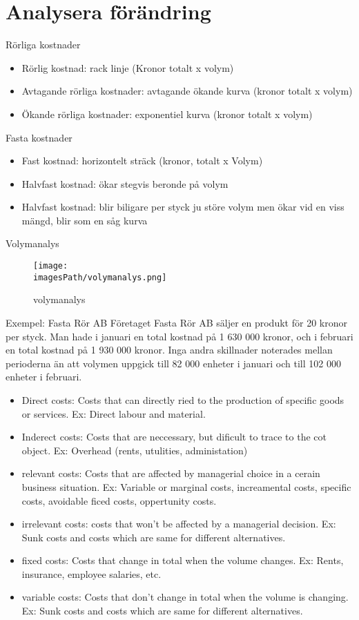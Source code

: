 \documentclass{article}
\newcommand{\imagesPath}{images}
\begin{document}
\section{Analysera förändring}
Rörliga kostnader
\begin{itemize}
    \item Rörlig kostnad: rack linje (Kronor totalt x volym)
    \item Avtagande rörliga kostnader: avtagande ökande kurva (kronor totalt x volym)
    \item Ökande rörliga kostnader: exponentiel kurva (kronor totalt x volym)
\end{itemize}

Fasta kostnader 
\begin{itemize}
    \item Fast kostnad: horizontelt sträck (kronor, totalt x Volym)
    \item Halvfast kostnad: ökar stegvis beronde på volym
    \item Halvfast kostnad: blir biligare per styck ju störe volym men ökar vid en viss mängd, blir som en såg kurva
\end{itemize}

Volymanalys 
\begin{figure}[!h]
    \centering
    \texttt{[image: \\imagesPath/volymanalys.png]}
    \caption{volymanalys}
\end{figure}

\begin{exampleblock}{Exempel: Fasta Rör AB}
    Företaget Fasta Rör AB säljer en produkt för 20 kronor per styck. Man hade i januari en 
    total kostnad på 1 630 000 kronor, och i februari en total kostnad på 1 930 000 kronor. Inga 
    andra skillnader noterades mellan perioderna än att volymen uppgick till 82 000 enheter i januari 
    och till 102 000 enheter i februari.
\end{exampleblock}

\begin{itemize}
    \item Direct costs: Costs that can directly ried to the production of specific goods or services.
    Ex: Direct labour and material.
    \item Inderect costs: Costs that are neccessary, but dificult to trace to the cot object. 
    Ex: Overhead (rents, utulities, administation)
    \item relevant costs: Costs that are affected by managerial choice in a cerain business situation.
    Ex: Variable or marginal costs, increamental costs, specific costs, avoidable ficed costs, oppertunity costs.
    \item irrelevant costs: costs that won't be affected by a managerial decision.
    Ex: Sunk costs and costs which are same for different alternatives.
    \item fixed costs: Costs that change in total when the volume changes.
    Ex: Rents, insurance, employee salaries, etc.
    \item variable costs: Costs that don't change in total when the volume is changing.
    Ex: Sunk costs and costs which are same for different alternatives.
\end{itemize}
\end{document}
